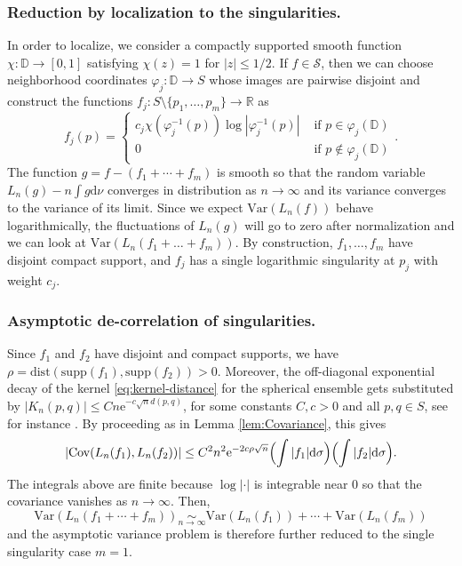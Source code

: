 \documentclass[10pt,reqno]{amsart}
\numberwithin{equation}{section}
\numberwithin{figure}{section}
\theoremstyle{plain}
\newcommand{\<}{\langle}
\renewcommand{\>}{\rangle}
\begin{document}
\subsubsection{Reduction by localization to the singularities.}
	In order to localize, we consider a compactly supported smooth function $\chi: \mathbb D \to [0,1]$ satisfying $\chi(z) = 1$ for
	$|z| \leq  1/2$. If $f\in\mathcal{S}$, then we can choose neighborhood coordinates
	$\varphi_j:\mathbb D \to S$ whose images are 
    pairwise disjoint
	and	construct the functions $f_j: S \setminus \{p_1,\dots,p_m\} \to \mathbb{R}$ as
	\begin{equation}
    f_j(p) = \left\{ \begin{array}{ll} c_j\chi(\varphi_j^{-1}(p)) \log|\varphi_j^{-1}(p)| & \text{ if }
	p \in \varphi_j(\mathbb D)  			\\
	0 & \mbox{ if } p \notin \varphi_j(\mathbb D) \end{array}\right.  .
    \end{equation}
	The function $g=f-(f_1+\cdots+f_m)$ is smooth so that the random variable
    $L_n(g)-n\int g\mathrm{d}\nu$ converges in distribution as $n\to\infty$
    and its variance converges to the variance of its limit.
	Since we expect $\mathrm{Var}(L_n(f))$ behave logarithmically, the fluctuations of $L_n(g)$ will go to zero after normalization and we can look at $\mathrm{Var}(L_n(f_1+\dots+f_m))$. By construction, $f_1,\ldots,f_m$ have disjoint compact support, and $f_j$ 
    has a single logarithmic singularity
    at $p_j$ with weight $c_j$.
    
\subsubsection{Asymptotic de-correlation of singularities.}
    Since $f_1$ and $f_2$ have disjoint and compact supports, we have
    $\rho=\mathrm{dist}(\mathrm{supp}(f_1),\mathrm{supp}(f_2))>0$.
    Moreover, the off-diagonal exponential decay of the kernel \eqref{eq:kernel-distance} for the spherical ensemble gets substituted by
    $|K_n(p,q)|\leq Cn\mathrm{e}^{-c\sqrt{n}d(p,q)}$, for some constants $C,c>0$ and all $p,q\in S$,
    see for instance \cite[right after Th.~2.4]{MR2016088}. By proceeding as in Lemma 
    \ref{lem:Covariance}, this gives
   \begin{equation}
    |\mathrm{Cov}(L_n(f_1),L_n(f_2))|
	\leq C^2n^2\mathrm{e}^{-2c\rho\sqrt{n}}
	\Bigl(\int|f_1|\mathrm{d}\sigma\Bigr) 
	\Bigl(\int|f_2|\mathrm{d}\sigma\Bigr). 
	\end{equation}
    The integrals above are finite because $\log\left|\cdot\right|$ is integrable near $0$
	so that the covariance vanishes as $n\to\infty$. Then,
	\begin{equation}
    \mathrm{Var}(L_n(f_1+\cdots+f_m))
    \underset{n\to\infty}{\sim}
    \mathrm{Var}(L_n(f_1))+\cdots+\mathrm{Var}(L_n(f_m))    
	\end{equation}
    and the asymptotic variance problem is therefore further reduced to the single singularity case $m=1$.
\end{document}

